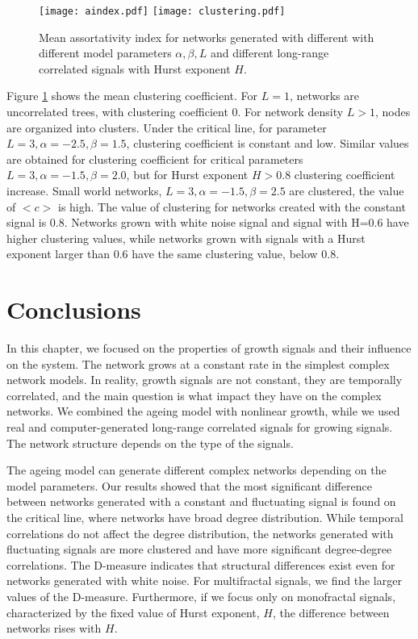 \begin{figure}[h]
	\centering
	\texttt{[image: aindex.pdf]}
	\texttt{[image: clustering.pdf]}
	\caption[Assortativity index and mean clustering coefficient.]{Mean assortativity index for networks generated with different with different model parameters $\alpha, \beta, L$ and different long-range correlated signals with Hurst exponent $H$.}
	\label{fig:aindex}
\end{figure} 

Figure \ref{fig:aindex} shows the mean clustering coefficient. For $L=1$, networks are uncorrelated trees, with clustering coefficient $0$. For network density $L>1$, nodes are organized into clusters. Under the critical line, for parameter  $L=3, \alpha=-2.5, \beta=1.5 $, clustering coefficient is constant and low. Similar values are obtained for clustering coefficient for critical parameters $L=3, \alpha=-1.5, \beta=2.0$, but for Hurst exponent $H>0.8$ clustering coefficient increase. Small world networks,  $L=3, \alpha=-1.5, \beta=2.5$ are clustered, the value of $<c>$ is high.  The value of clustering for networks created with the constant signal is 0.8. Networks grown with white noise signal and signal with H=0.6 have higher clustering values, while networks grown with signals with a Hurst exponent larger than 0.6 have the same clustering value, below 0.8. 

\section{Conclusions}

In this chapter, we focused on the properties of growth signals and their influence on the system. The network grows at a constant rate in the simplest complex network models. In reality, growth signals are not constant, they are temporally correlated, and the main question is what impact they have on the complex networks. We combined the ageing model with nonlinear growth, while we used real and computer-generated long-range correlated signals for growing signals. The network structure depends on the type of the signals.

The ageing model can generate different complex networks depending on the model parameters. Our results showed that the most significant difference between networks generated with a constant and fluctuating signal is found on the critical line, where networks have broad degree distribution. While temporal correlations do not affect the degree distribution, the networks generated with fluctuating signals are more clustered and have more significant degree-degree correlations. The D-measure indicates that structural differences exist even for networks generated with white noise. For multifractal signals, we find the larger values of the D-measure. Furthermore, if we focus only on monofractal signals, characterized by the fixed value of Hurst exponent, $H$, the difference between networks rises with $H$. 

